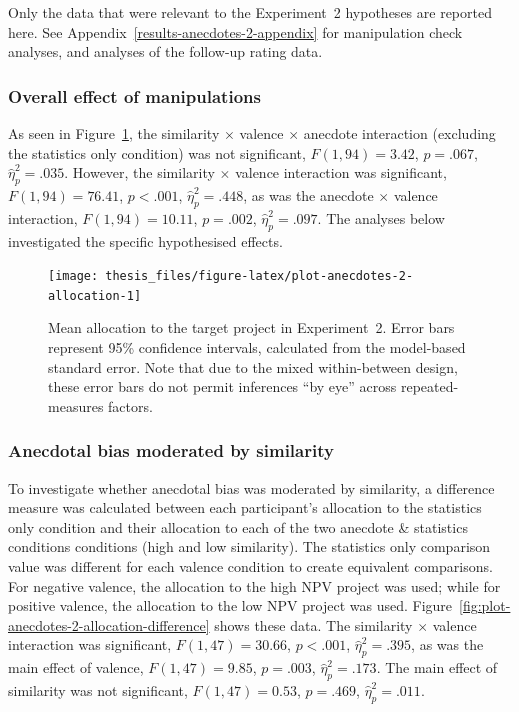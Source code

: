 \documentclass[a4paper, nobind, dvipsnames]{templates/ociamthesis}
\theoremstyle{definition}
\theoremstyle{definition}
\theoremstyle{definition}
\theoremstyle{definition}
\theoremstyle{remark}
\begin{document}
Only the data that were relevant to the Experiment~2 hypotheses are reported
here. See Appendix~\ref{results-anecdotes-2-appendix} for manipulation check
analyses, and analyses of the follow-up rating data.

\subsubsection{Overall effect of manipulations}

As seen in Figure~\ref{fig:plot-anecdotes-2-allocation}, the similarity
\(\times\) valence \(\times\) anecdote interaction (excluding the statistics only
condition) was not significant,
\(F(1, 94) = 3.42\), \(p = .067\), \(\hat{\eta}^2_p = .035\). However,
the similarity \(\times\) valence interaction was significant,
\(F(1, 94) = 76.41\), \(p < .001\), \(\hat{\eta}^2_p = .448\), as was the anecdote
\(\times\) valence interaction,
\(F(1, 94) = 10.11\), \(p = .002\), \(\hat{\eta}^2_p = .097\). The analyses below investigated the specific hypothesised effects.



\begin{figure}
\texttt{[image: thesis\_files/figure-latex/plot-anecdotes-2-allocation-1]} \caption{Mean allocation to the target project in Experiment~2. Error bars represent 95\% confidence intervals, calculated from the model-based standard error. Note that due to the mixed within-between design, these error bars do not permit inferences ``by eye'' across repeated-measures factors.}\label{fig:plot-anecdotes-2-allocation}
\end{figure}

\subsubsection{Anecdotal bias moderated by similarity}

To investigate whether anecdotal bias was moderated by similarity, a difference
measure was calculated between each participant's allocation to the statistics
only condition and their allocation to each of the two anecdote \& statistics
conditions conditions (high and low similarity). The statistics only comparison
value was different for each valence condition to create equivalent comparisons.
For negative valence, the allocation to the high NPV project was used; while for
positive valence, the allocation to the low NPV project was used.
Figure~\ref{fig:plot-anecdotes-2-allocation-difference} shows these data. The
similarity \(\times\) valence interaction was significant,
\(F(1, 47) = 30.66\), \(p < .001\), \(\hat{\eta}^2_p = .395\), as was the
main effect of valence,
\(F(1, 47) = 9.85\), \(p = .003\), \(\hat{\eta}^2_p = .173\). The main effect of
similarity was not significant,
\(F(1, 47) = 0.53\), \(p = .469\), \(\hat{\eta}^2_p = .011\).
\end{document}
